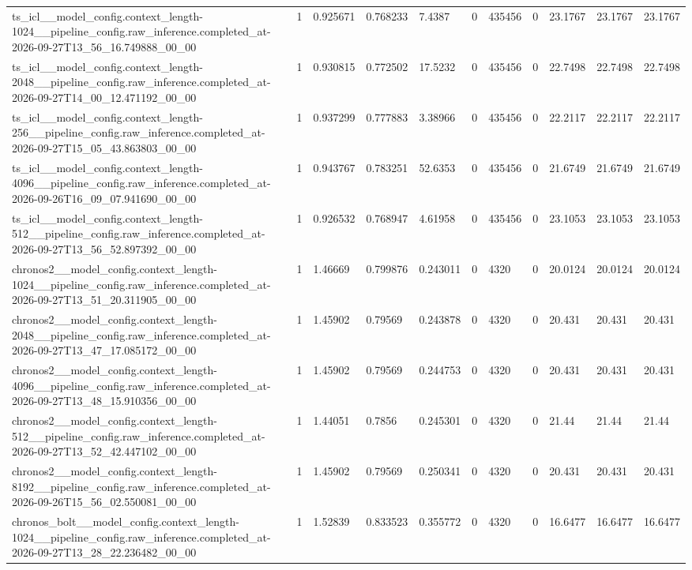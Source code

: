 \begin{tabular}{lllllllllll}
ts\_icl\_\_model\_config.context\_length-1024\_\_pipeline\_config.raw\_inference.completed\_at-2026-09-27T13\_56\_16.749888\_00\_00 & 1 & 0.925671 & 0.768233 & 7.4387 & 0 & 435456 & 0 & 23.1767 & 23.1767 & 23.1767 \\
ts\_icl\_\_model\_config.context\_length-2048\_\_pipeline\_config.raw\_inference.completed\_at-2026-09-27T14\_00\_12.471192\_00\_00 & 1 & 0.930815 & 0.772502 & 17.5232 & 0 & 435456 & 0 & 22.7498 & 22.7498 & 22.7498 \\
ts\_icl\_\_model\_config.context\_length-256\_\_pipeline\_config.raw\_inference.completed\_at-2026-09-27T15\_05\_43.863803\_00\_00 & 1 & 0.937299 & 0.777883 & 3.38966 & 0 & 435456 & 0 & 22.2117 & 22.2117 & 22.2117 \\
ts\_icl\_\_model\_config.context\_length-4096\_\_pipeline\_config.raw\_inference.completed\_at-2026-09-26T16\_09\_07.941690\_00\_00 & 1 & 0.943767 & 0.783251 & 52.6353 & 0 & 435456 & 0 & 21.6749 & 21.6749 & 21.6749 \\
ts\_icl\_\_model\_config.context\_length-512\_\_pipeline\_config.raw\_inference.completed\_at-2026-09-27T13\_56\_52.897392\_00\_00 & 1 & 0.926532 & 0.768947 & 4.61958 & 0 & 435456 & 0 & 23.1053 & 23.1053 & 23.1053 \\
chronos2\_\_model\_config.context\_length-1024\_\_pipeline\_config.raw\_inference.completed\_at-2026-09-27T13\_51\_20.311905\_00\_00 & 1 & 1.46669 & 0.799876 & 0.243011 & 0 & 4320 & 0 & 20.0124 & 20.0124 & 20.0124 \\
chronos2\_\_model\_config.context\_length-2048\_\_pipeline\_config.raw\_inference.completed\_at-2026-09-27T13\_47\_17.085172\_00\_00 & 1 & 1.45902 & 0.79569 & 0.243878 & 0 & 4320 & 0 & 20.431 & 20.431 & 20.431 \\
chronos2\_\_model\_config.context\_length-4096\_\_pipeline\_config.raw\_inference.completed\_at-2026-09-27T13\_48\_15.910356\_00\_00 & 1 & 1.45902 & 0.79569 & 0.244753 & 0 & 4320 & 0 & 20.431 & 20.431 & 20.431 \\
chronos2\_\_model\_config.context\_length-512\_\_pipeline\_config.raw\_inference.completed\_at-2026-09-27T13\_52\_42.447102\_00\_00 & 1 & 1.44051 & 0.7856 & 0.245301 & 0 & 4320 & 0 & 21.44 & 21.44 & 21.44 \\
chronos2\_\_model\_config.context\_length-8192\_\_pipeline\_config.raw\_inference.completed\_at-2026-09-26T15\_56\_02.550081\_00\_00 & 1 & 1.45902 & 0.79569 & 0.250341 & 0 & 4320 & 0 & 20.431 & 20.431 & 20.431 \\
chronos\_bolt\_\_model\_config.context\_length-1024\_\_pipeline\_config.raw\_inference.completed\_at-2026-09-27T13\_28\_22.236482\_00\_00 & 1 & 1.52839 & 0.833523 & 0.355772 & 0 & 4320 & 0 & 16.6477 & 16.6477 & 16.6477 \\

\end{tabular}

